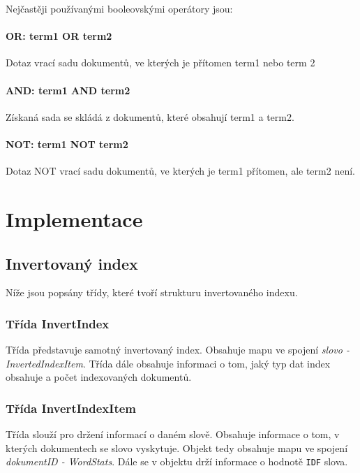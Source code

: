 \documentclass[12pt, a4paper]{article}
\begin{document}
\noindent Nejčastěji používanými booleovskými operátory jsou:

\paragraph{OR: term1 OR term2}
Dotaz vrací sadu dokumentů, ve kterých je přítomen term1 nebo term 2

\paragraph{AND: term1 AND term2}
Získaná sada se skládá z dokumentů, které obsahují term1 a term2.

\paragraph{NOT: term1 NOT term2}
Dotaz NOT vrací sadu dokumentů, ve kterých je term1 přítomen, ale term2 není.

















\section{Implementace}

\subsection{Invertovaný index}
\noindent Níže jsou popsány třídy, které tvoří strukturu invertovaného indexu.

\subsubsection{Třída InvertIndex}
\noindent Třída představuje samotný invertovaný index. Obsahuje mapu ve spojení \textit{slovo - InvertedIndexItem}. Třída dále obsahuje informaci o tom, jaký typ dat index obsahuje a počet indexovaných dokumentů.


\subsubsection{Třída InvertIndexItem}
\noindent Třída slouží pro držení informací o daném slově. Obsahuje informace o tom, v kterých dokumentech se slovo vyskytuje. Objekt tedy obsahuje mapu ve spojení \textit{dokumentID - WordStats}. Dále se v objektu drží informace o hodnotě \texttt{IDF} slova.
\end{document}
